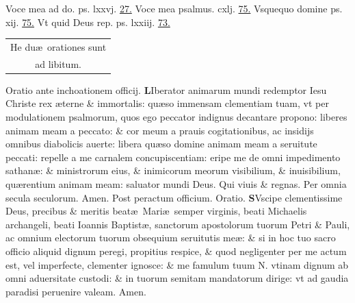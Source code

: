 \documentclass[a5paper,10pt]{book}
\def\ae{æ}
\begin{document}
\begin{multicols}{2}
\newline Voce mea ad do. ps. lxxvj. \hfill \hyperlink{ps76}{27.}
\newline Voce mea psalmus. cxlj. \hfill \hyperlink{ps141}{75.}
\newline Vsquequo domine ps. xij. \hfill \hyperlink{ps12}{75.}
\newline Vt quid Deus rep. ps. lxxiij. \hfill \hyperlink{ps73}{73.}
\begin{center}
\begin{tabular}{l r}
\multicolumn{2}{c}{He du\ae \ orationes sunt}\\
\multicolumn{2}{c}{ad libitum.}
\end{tabular}
\end{center}
\end{multicols}


\begin{multicols}{2}
\noindent \color{red} Oratio ante inchoationem officij. \color{black}
\lettrine[lines=2]{\color{red} \bfseries L}{}Iberator animarum mundi redemptor Iesu Christe rex \ae terne \& immortalis:
qu\ae so immensam clementiam tuam, vt per modulationem psalmorum, quos ego peccator indignus decantare propono:
liberes animam meam a peccato:
\& cor meum a prauis cogitationibus, ac insidijs %
omnibus diabolicis auerte:
libera qu\ae so domine animam meam a seruitute peccati:
repelle a me carnalem concupiscentiam:
eripe me de omni impedimento sathan\ae :
\& ministrorum eius, \& inimicorum meorum visibilium, \& inuisibilium, qu\ae rentium animam meam:
saluator mundi Deus. Qui viuis \& regnas. Per omnia secula seculorum. Amen.
\newline \color{red} Post peractum officium. Oratio. \color{black}
\lettrine[lines=2]{\color{red} \bfseries S}{}Vscipe clementissime Deus, precibus \& meritis beat\ae \ Mari\ae \ semper virginis, beati Michaelis archangeli, beati Ioannis Baptist\ae , sanctorum apostolorum tuorum Petri \& Pauli, ac omnium electorum tuorum obsequium seruitutis me\ae :
\& si in hoc tuo sacro officio aliquid dignum peregi, propitius respice, \& quod negligenter per me actum est, vel imperfecte, clementer ignosce:
\& me famulum tuum N. vtinam dignum ab omni aduersitate %
custodi:
\& in tuorum semitam mandatorum dirige:
vt ad gaudia paradisi peruenire valeam. Amen.
\end{multicols}
\end{document}
